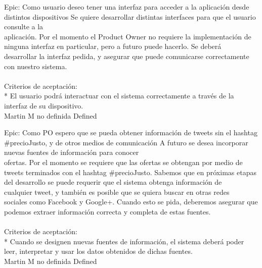 	{Epic: Como usuario deseo tener una interfaz para acceder a la aplicación desde distintos dispositivos} %
	{Se quiere desarrollar distintas interfaces para que el usuario consulte a la\\
aplicación. Por el momento el Product Owner no requiere la implementación de\\
ninguna interfaz en particular, pero a futuro puede hacerlo. Se deberá\\
desarrollar la interfaz pedida, y asegurar que puede comunicarse correctamente\\
con nuestro sistema.\\
  \\
Criterios de aceptación:\\
* El usuario podrá interactuar con el sistema correctamente a través de la interfaz de su dispositivo.\\
} %
	{} %
	{} %
	{Martin M} %
	{no definida} %
	{Defined} %


\vspace{20pt}

	{Epic: Como PO espero que se pueda obtener información de tweets sin el hashtag #precioJusto, y de otros medios de comunicación} %
	{A futuro se desea incorporar nuevas fuentes de información para conocer\\
ofertas. Por el momento se requiere que las ofertas se obtengan por medio de\\
tweets terminados con el hashtag #precioJusto. Sabemos que en próximas etapas\\
del desarrollo se puede requerir que el sistema obtenga información de\\
cualquier tweet, y también es posible que se quiera buscar en otras redes\\
sociales como Facebook y Google+. Cuando esto se pida, deberemos asegurar que\\
podemos extraer información correcta y completa de estas fuentes.\\
  \\
Criterios de aceptación:\\
* Cuando se designen nuevas fuentes de información, el sistema deberá poder leer, interpretar y usar los datos obtenidos de dichas fuentes.\\
} %
	{} %
	{} %
	{Martin M} %
	{no definida} %
	{Defined} %


